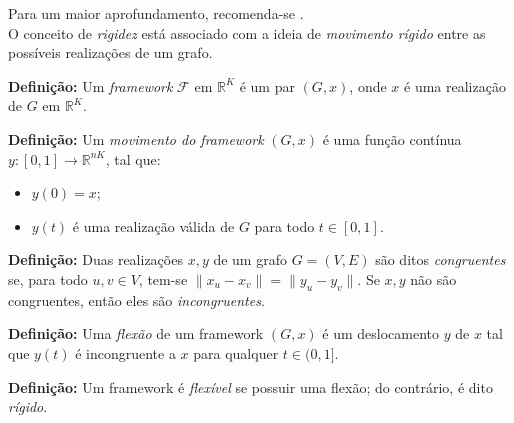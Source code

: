 Para um maior aprofundamento, recomenda-se \cite{libertiEDG, rigidezGrafosEAplicacoesAnaCarlile}.
\\

O conceito de \textit{rigidez} está associado com a ideia de \textit{movimento rígido} entre as possíveis realizações de um grafo.
\begin{center}
	\begin{minipage}{0.93 \linewidth}
		\textbf{Definição:} Um \textit{framework} $\mathcal{F}$ em $\mathbb{R}^K$ é um par $(G,x)$, onde $x$ é uma realização de $G$ em $\mathbb{R}^K$.
	\end{minipage}
\end{center}

\begin{center}
	\begin{minipage}{0.93 \linewidth}
		\textbf{Definição:} Um \textit{movimento do framework} $(G,x)$ é uma função contínua $y : [0,1]\longrightarrow \mathbb{R}^{nK}$, tal que:
		\begin{itemize}
			\item $y(0) = x$;
			\item $y(t)$ é uma realização válida de $G$ para todo $t \in [0,1]$.
		\end{itemize}
	\end{minipage}
\end{center}

\begin{center}
	\begin{minipage}{0.93 \linewidth}
		\textbf{Definição:} Duas realizações $x,y$ de um grafo $G=(V,E)$ são ditos \textit{congruentes} se, para todo $u,v\in V$, tem-se $\| x_u - x_v\| = \|y_u - y_v\|$. Se $x,y$ não são congruentes, então eles são \textit{incongruentes}.
	\end{minipage}
\end{center}

\begin{center}
	\begin{minipage}{0.93 \linewidth}
		\textbf{Definição:} Uma \textit{flexão} de um framework $(G,x)$ é um deslocamento $y$ de $x$ tal que $y(t)$ é incongruente a $x$ para qualquer $t\in(0,1]$.
	\end{minipage}
\end{center}

\begin{center}
	\begin{minipage}{0.93 \linewidth}
		\textbf{Definição:} Um framework é \textit{flexível} se possuir uma flexão; do contrário, é dito \textit{rígido}.
	\end{minipage}
\end{center}

